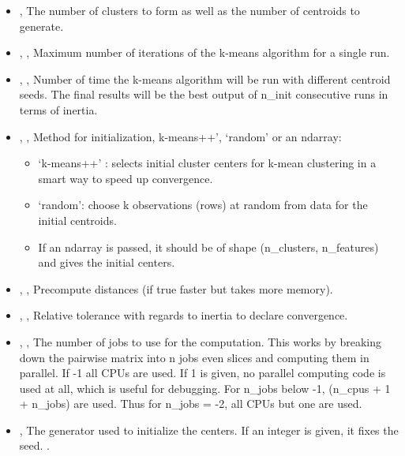 \begin{itemize}
	\item {}, 
The number of clusters to form as well as the number of centroids to
generate. 
	\item {}, ,
Maximum number of iterations of the k-means algorithm for a single run.
	\item {}, ,
Number of time the k-means algorithm will be run with different centroid
 seeds. The final results will be the best output of n\_init consecutive
 runs in terms of inertia. 
	\item {}, ,
Method for initialization, k-means++’, ‘random’ or an ndarray:
		\begin{itemize}
			\item ‘k-means++’ : selects initial cluster
centers for k-mean clustering in a smart way to speed up convergence.
			\item ‘random’: choose k observations (rows) at
 random from data for the initial centroids.
			\item If an ndarray is passed, it should be of
 shape (n\_clusters, n\_features) and gives the initial centers.
		\end{itemize}
	\item {}, , Precompute distances (if true faster but takes more memory).
	\item {}, , Relative
tolerance with regards to inertia to declare convergence. 
	\item {}, , The number
of jobs to use for the computation. This works by breaking down the pairwise
 matrix into n jobs even slices and computing them in parallel. If -1 all CPUs
 are used. If 1 is given, no parallel computing code is used at all, which is
useful for debugging. For n\_jobs below -1, (n\_cpus + 1 + n\_jobs) are used. Thus
 for n\_jobs = -2, all CPUs but one are used. 
	\item {},  The generator used to initialize the centers. If an integer
 is given, it fixes the seed. .
\end{itemize}

